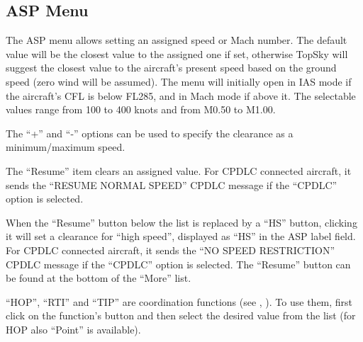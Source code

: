 \documentclass[a4paper,oneside,11pt]{memoir}
\begin{document}
\subsection{ASP Menu}
\label{menu:asp}

\begin{center}
  \begin{minipage}[b]{0.14\textwidth}\end{minipage}\hfill 
  \begin{minipage}[b]{0.14\textwidth}\end{minipage}\hfill 
  \begin{minipage}[b]{0.14\textwidth}\end{minipage}\hfill  
  \begin{minipage}[b]{0.14\textwidth}\end{minipage}\hfill 
\end{center} 

\bigskip

The ASP menu allows setting an assigned speed or Mach number. The default value will be the closest value to the assigned one if set, otherwise TopSky will suggest the closest value to the aircraft’s present speed based on the ground speed (zero wind will be assumed). The menu will initially open in IAS mode if the aircraft’s CFL is below FL285, and in Mach mode if above it. The selectable values range from 100 to 400 knots and from M0.50 to M1.00.

\bigskip

The “+” and “-” options can be used to specify the clearance
as a minimum/maximum speed.

\bigskip

The “Resume” item clears an assigned value. For CPDLC connected aircraft, it sends the “RESUME NORMAL SPEED” CPDLC message if the “CPDLC” option is selected.

\bigskip

When the “Resume” button below the list is replaced by a “HS” button, clicking it will set a clearance for “high speed”, displayed as “HS” in the ASP label field. For CPDLC connected aircraft, it sends the “NO SPEED RESTRICTION” CPDLC message if the “CPDLC” option is selected. The “Resume” button can be found at the bottom of the “More” list.

\bigskip

“HOP”, “RTI” and “TIP” are coordination functions (see , ). To use them, first click on the function’s button and then select the desired value from the list (for HOP also “Point” is available).
\end{document}
